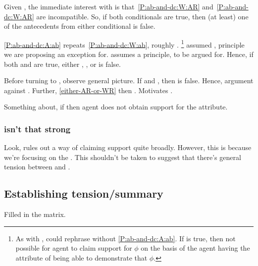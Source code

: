 \begin{note}
  Given \mcA{}, the immediate interest with \mcB{} is that~\ref{P:ab-and-dc:W:AR} and~\ref{P:ab-and-dc:W:AR} are incompatible.
  So, if both conditionals are true, then (at least) one of the antecedents from either conditional is false.

  \ref{P:ab-and-dc:A:ab} repeats~\ref{P:ab-and-dc:W:ab}, roughly \eA{}.\nolinebreak
  \footnote{
    As with \mcA{}, could rephrase without \ref{P:ab-and-dc:A:ab}.
    If \nI{} is true, then not possible for agent to claim support for \(\phi\) on the basis of the agent having the attribute of being able to demonstrate that \(\phi\).
  }
  \mcA{} assumed \ESU{}, principle we are proposing an exception for.
  \mcB{} assumes a principle, \nI{} to be argued for.
  Hence, if both \mcA{} and \mcB{} are true, either \eA{}, \ESU{}, or \nI{} is false.

  Before turning to \nI{}, observe general picture.
  If \eA{} and \nI{}, then \ESU{} is false.
  Hence, argument against \ESU{}.
  Further, \ref{either-AR-or-WR} then \WR{}.
  Motivates \EAS{}.
\end{note}



\begin{note}
  Something about, if \eA{} then agent does not obtain support for the attribute.
\end{note}


\subsubsection{\nI{} isn't that strong}
\label{sec:ni-isnt-that}

\begin{note}
  Look, \nI{} rules out a way of claiming support quite broadly.
  However, this is because we're focusing on the \aben{}.
  This shouldn't be taken to suggest that there's general tension between \nI{} and \nr{}.
\end{note}

\subsection{Establishing tension/summary}
\label{sec:establishing-tension}

\begin{note}
  Filled in the matrix.
\end{note}

